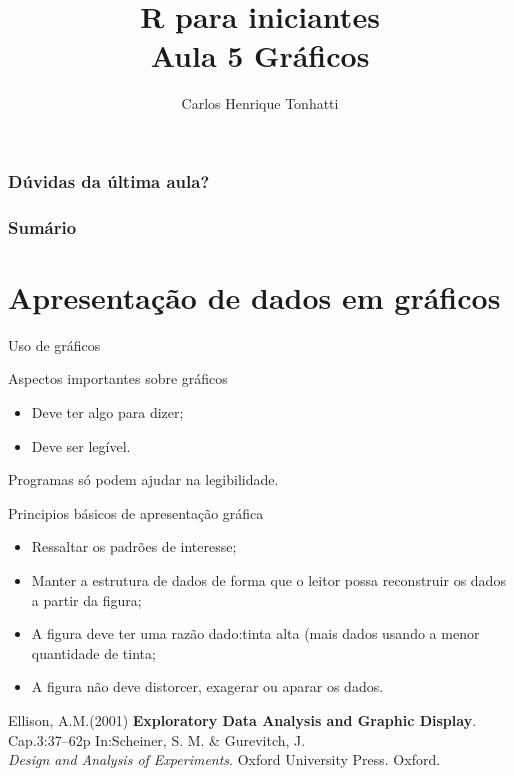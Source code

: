 \documentclass{beamer}
\title[Linguagem R]{R para iniciantes\\ Aula 5 Gráficos}
\author {Carlos Henrique Tonhatti}
\institute[Unicamp]{Universidade Estadual de Campinas}
\date{}
\begin{document}
\frame{\titlepage} %

\begin{frame}
  \frametitle{Dúvidas da última aula?}
\end{frame}

\begin{frame}
 \frametitle{Sumário}
 \tableofcontents[pausesections]
  \setcounter{tocdepth}{2}%
\end{frame}



\section{Apresentação de dados em gráficos}

\begin{frame}{Uso de gráficos}
\centering
{}
\end{frame}

\begin{frame}{Aspectos importantes sobre gráficos}

  \begin{itemize}
  \item Deve ter algo para dizer;
  \item Deve ser legível. 
  \end{itemize}
\pause
Programas só podem ajudar na legibilidade.   
\end{frame}

\begin{frame}{Principios básicos de apresentação gráfica}
  \begin{itemize}[<+->]
  \item Ressaltar os padrões de interesse;
  \item Manter a estrutura de dados de forma que o leitor possa reconstruir os dados a partir da figura;
  \item A figura deve ter uma razão dado:tinta alta (mais dados usando a menor quantidade de tinta;
  \item A figura não deve distorcer, exagerar ou aparar os dados.
  \end{itemize}
  \vfill{} \pause 
\tiny{Ellison, A.M.(2001) \textbf{Exploratory Data Analysis and Graphic Display}. Cap.3:37--62p In:Scheiner, S. M. \& Gurevitch, J.\\\hspace{20pt} \textit{Design and Analysis of Experiments}. Oxford University Press. Oxford.}
\end{frame}
\end{document}
